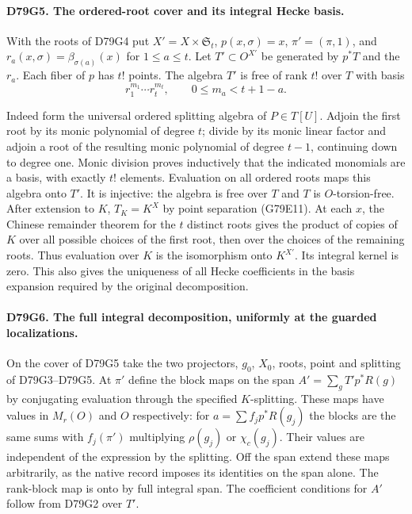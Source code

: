 \paragraph{D79G5. The ordered-root cover and its integral Hecke basis.}
With the roots of D79G4 put $X'=X\times\mathfrak S_t$,
$p(x,\sigma)=x$, $\pi'=(\pi,1)$, and
$r_a(x,\sigma)=\beta_{\sigma(a)}(x)$ for $1\le a\le t$.
Let $T'\subset O^{X'}$ be generated by $p^*T$ and the $r_a$.
Each fiber of $p$ has $t!$ points. The algebra $T'$ is free of
rank $t!$ over $T$ with basis
\[
  r_1^{m_1}\cdots r_t^{m_t},\qquad 0\le m_a<t+1-a.
\]

Indeed form the universal ordered splitting algebra of $P\in T[U]$.
Adjoin the first root by its monic polynomial of degree $t$;
divide by its monic linear factor and adjoin a root of the resulting
monic polynomial of degree $t-1$, continuing down to degree one.
Monic division proves inductively that the indicated monomials are
a basis, with exactly $t!$ elements. Evaluation on all ordered
roots maps this algebra onto $T'$. It is injective: the algebra
is free over $T$ and $T$ is $O$-torsion-free. After extension to
$K$, $T_K=K^X$ by point separation (G79E11). At each $x$, the
Chinese remainder theorem for the $t$ distinct roots gives the
product of copies of $K$ over all possible choices of the first
root, then over the choices of the remaining roots. Thus evaluation
over $K$ is the isomorphism onto $K^{X'}$. Its integral kernel is
zero. This also gives the uniqueness of all Hecke coefficients in
the basis expansion required by the original decomposition.

\paragraph{D79G6. The full integral decomposition, uniformly at the guarded localizations.}
On the cover of D79G5 take the two projectors, $g_0$, $X_0$, roots,
point and splitting of D79G3--D79G5. At $\pi'$ define the block
maps on the span $A'=\sum_g T' p^*R(g)$ by conjugating evaluation
through the specified $K$-splitting. These maps have values in
$M_r(O)$ and $O$ respectively: for $a=\sum f_j p^*R(g_j)$
the blocks are the same sums with $f_j(\pi')$ multiplying
$\rho(g_j)$ or $\chi_c(g_j)$. Their values are independent of
the expression by the splitting. Off the span extend these maps
arbitrarily, as the native record imposes its identities on the
span alone. The rank-block map is onto by full integral span.
The coefficient conditions for $A'$ follow from D79G2 over $T'$.


